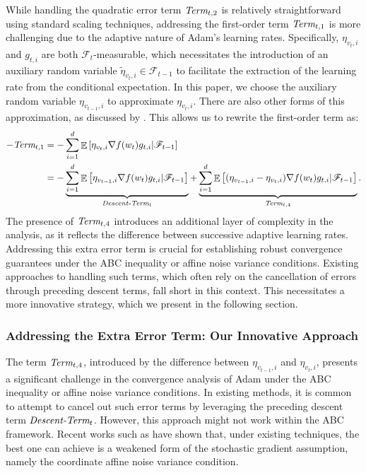 \documentclass{article} %
\DeclareMathOperator{\Expect}{\mathbb{E}}
\begin{document}
While handling the quadratic error term $\emph{Term}_{t,2}$ is relatively straightforward using standard scaling techniques, addressing the first-order term $\emph{Term}_{t,1}$ is more challenging due to the adaptive nature of Adam's learning rates. Specifically, $\eta_{v_{t},i}$ and $g_{t,i}$ are both $\mathscr{F}_{t}$-measurable, which necessitates the introduction of an auxiliary random variable $\tilde{\eta}_{v_{t},i}\in\mathscr{F}_{t-1}$ to facilitate the extraction of the learning rate from the conditional expectation. In this paper, we choose the auxiliary random variable $\eta_{v_{t-1},i}$ to approximate $\eta_{v_{t},i}$. There are also other forms of this approximation, as discussed by \cite{wang2023convergence,wang2024closing}. This allows us to rewrite the first-order term as:
\begin{align*}
-\emph{Term}_{t,1}&=-\sum_{i=1}^{d}\Expect\left[\eta_{v_{t},i}\nabla f(w_{t})g_{t,i}|\mathscr{F}_{t-1}\right]\\
&=-\underbrace{\sum_{i=1}^{d}\Expect\left[\eta_{v_{t-1},i}\nabla f(w_{t})g_{t,i}|\mathscr{F}_{t-1}\right]}_{\emph{Descent-Term}_{t}}+\underbrace{\sum_{i=1}^{d}\Expect\left[(\eta_{v_{t-1},i}-\eta_{v_{t},i})\nabla f(w_{t})g_{t,i}|\mathscr{F}_{t-1}\right]}_{\emph{Term}_{t,4}}.
\end{align*}
The presence of $\emph{Term}_{t,4}$ introduces an additional layer of complexity in the analysis, as it reflects the difference between successive adaptive learning rates. Addressing this extra error term is crucial for establishing robust convergence guarantees under the ABC inequality or affine noise variance conditions. Existing approaches to handling such terms, which often rely on the cancellation of errors through preceding descent terms, fall short in this context. This necessitates a more innovative strategy, which we present in the following section.

\subsubsection{Addressing the Extra Error Term: Our Innovative Approach}\label{sec_1}
The term $\emph{Term}_{t,4}$, introduced by the difference between $\eta_{v_{t-1},i}$ and $\eta_{v_{t},i}$, presents a significant challenge in the convergence analysis of Adam under the ABC inequality or affine noise variance conditions. In existing methods, it is common to attempt to cancel out such error terms by leveraging the preceding descent term $\emph{Descent-Term}_{t}$. However, this approach might not work within the ABC framework. Recent works such as \cite{wang2023convergence,wang2024closing} have shown that, under existing techniques, the best one can achieve is a weakened form of the stochastic gradient assumption, namely the coordinate affine noise variance condition.
\end{document}
